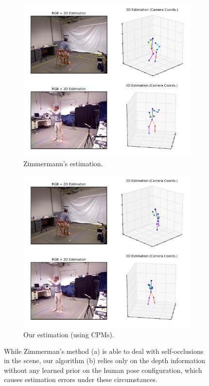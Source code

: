 \begin{figure}[h]\centering
    \begin{subfigure}{0.49\textwidth}\centering
        \includegraphics[width=\textwidth]{figures/zimmermann_selfocclusion.png} 
        \caption{Zimmermann's estimation.}
        \label{subfig:zimmermann_selfocclusion}
    \end{subfigure}
    \begin{subfigure}{0.49\textwidth}\centering
        \includegraphics[width=\textwidth]{figures/ours_selfocclusion.png}
        \caption{Our estimation (using CPMs).}
        \label{subfig:ours_selfocclusion}
    \end{subfigure}
    \caption{While Zimmerman's method (a) is able to deal with self-occlusions in the scene, our algorithm (b) relies only on the depth information without any learned prior on the human pose configuration, which causes estimation errors under these circumstances.}
    \label{fig:selfocclusion}
\end{figure}

